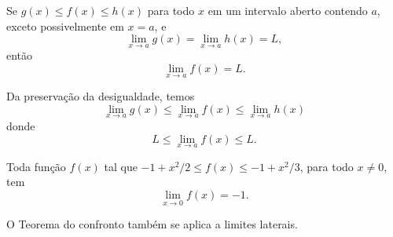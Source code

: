 \begin{teo}\label{teo:confronto}
  Se $g(x) \leq f(x) \leq h(x)$ para todo $x$ em um intervalo aberto contendo $a$, exceto possivelmente em $x=a$, e
  \begin{equation}
    \lim_{x\to a} g(x) = \lim_{x\to a} h(x) = L,
  \end{equation}
  então
  \begin{equation}
    \lim_{x\to a} f(x) = L.
  \end{equation}
\end{teo}
\begin{dem}
  Da preservação da desigualdade, temos
  \begin{equation}
    \lim_{x\to a} g(x) \leq \lim_{x\to a} f(x) \leq \lim_{x\to a} h(x)
  \end{equation}
  donde
  \begin{equation}
    L \leq \lim_{x\to a} f(x) \leq L.
  \end{equation}
\end{dem}

\begin{exer}
  Toda função $f(x)$ tal que $-1+x^2/2 \leq f(x) \leq -1+x^2/3$, para todo $x\neq 0$, tem
  \begin{equation}
    \lim_{x\to 0} f(x) = -1.
  \end{equation}
\end{exer}

\begin{obs}
  O Teorema do confronto também se aplica a limites laterais.
\end{obs}

